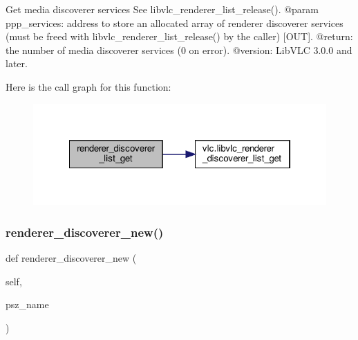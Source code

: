 \begin{DoxyVerb}Get media discoverer services
See libvlc_renderer_list_release().
@param ppp_services: address to store an allocated array of renderer discoverer services (must be freed with libvlc_renderer_list_release() by the caller) [OUT].
@return: the number of media discoverer services (0 on error).
@version: LibVLC 3.0.0 and later.
\end{DoxyVerb}
 Here is the call graph for this function\+:
\nopagebreak
\begin{figure}[H]
\begin{center}
\leavevmode
\includegraphics[width=322pt]{classvlc_1_1_instance_a59e7fce431e7dc8d89fbe9ee7b531340_cgraph}
\end{center}
\end{figure}
\mbox{\label{classvlc_1_1_instance_af5af3418f6e41d878b2d6f080df10ea5}} 
\subsubsection{\texorpdfstring{renderer\+\_\+discoverer\+\_\+new()}{renderer\_discoverer\_new()}}
{\footnotesize\ttfamily def renderer\+\_\+discoverer\+\_\+new (\begin{DoxyParamCaption}\item[{}]{self,  }\item[{}]{psz\+\_\+name }\end{DoxyParamCaption})}

